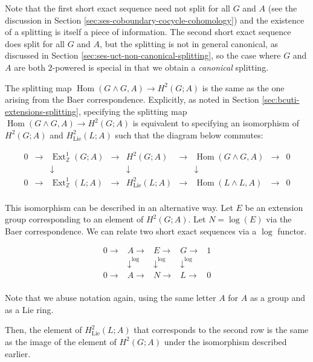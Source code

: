 \documentclass[10pt]{amsart}
\begin{document}
Note that the first short exact sequence need not split for all $G$
and $A$ (see the discussion in Section
\ref{sec:ses-coboundary-cocycle-cohomology}) and the existence of a
splitting is itself a piece of information. The second short exact
sequence does split for all $G$ and $A$, but the splitting is not in
general canonical, as discussed in Section
\ref{sec:ses-uct-non-canonical-splitting}, so the case where $G$ and
$A$ are both $2$-powered is special in that we obtain a {\em
  canonical} splitting.

The splitting map $\operatorname{Hom}(G\wedge G,A) \to H^2(G;A)$ is
the same as the one arising from the Baer correspondence. Explicitly,
as noted in Section \ref{sec:bcuti-extensions-splitting}, specifying the
splitting map $\operatorname{Hom}(G \wedge G, A) \to H^2(G;A)$ is
equivalent to specifying an isomorphism of $H^2(G;A)$ and
$H^2_{\text{Lie}}(L;A)$ such that the diagram below commutes:

$$\begin{array}{ccccccccc}
  0 &\to &\operatorname{Ext}^1_{\mathbb{Z}}(G;A) &\to &H^2(G;A) &\to &\operatorname{Hom}(G \wedge G,A) &\to &0\\
  & & \downarrow & & \downarrow & & \downarrow & & \\
  0 &\to &\operatorname{Ext}^1_{\mathbb{Z}}(L;A) & \to & H^2_{\text{Lie}}(L;A) & \to & \operatorname{Hom}(L \wedge L, A) & \to & 0\\
\end{array}$$

This isomorphism can be described in an alternative way. Let $E$ be an
extension group corresponding to an element of $H^2(G;A)$. Let $N =
\log(E)$ via the Baer correspondence. We can relate two short exact
sequences via a $\log$ functor.

$$\begin{array}{lllll}
    0 \to & A \to & E \to & G \to & 1 \\
    & \downarrow^{\log} & \downarrow^{\log} & \downarrow^{\log}&  \\
    0  \to & A \to & N \to & L \to & 0\\
\end{array}$$

Note that we abuse notation again, using the same letter $A$ for $A$
as a group and as a Lie ring.

Then, the element of $H^2_{\text{Lie}}(L;A)$ that corresponds to the
second row is the same as the image of the element of $H^2(G;A)$ under
the isomorphism described earlier.
\end{document}
